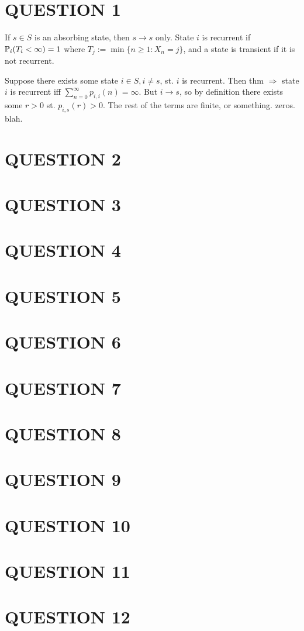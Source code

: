 \documentclass[a4paper]{article}
\begin{document}
	
\maketitle

\section{QUESTION 1}

If $ s \in S $ is an absorbing state, then $ s \to s $ only. State $ i $ is recurrent if $ \P_{i}(T_{i} < \infty ) = 1 $ where $ T_{j} := \min \{  n \geq  1 : X_{n} = j \} $, and a state is transient if it is not recurrent.

Suppose there exists some state $ i \in S, i \neq s $, st. $ i $ is recurrent. Then thm $ \Rightarrow $ state $ i $ is recurrent iff $ \sum_{n=0}^{\infty} p_{i,i}(n) = \infty $. But $ i \to s $, so by definition there exists some $ r > 0 $ st. $ p_{i,s}(r) > 0 $. The rest of the terms are finite, or something. zeros. blah. 
\section{QUESTION 2}
\section{QUESTION 3}
\section{QUESTION 4}
\section{QUESTION 5}
\section{QUESTION 6}
\section{QUESTION 7}
\section{QUESTION 8}
\section{QUESTION 9}
\section{QUESTION 10}
\section{QUESTION 11}
\section{QUESTION 12}
\end{document}
